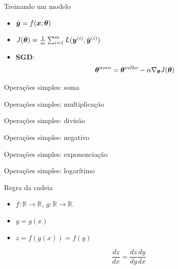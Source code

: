 \documentclass[10pt]{beamer}
\begin{document}
\begin{frame}{Treinando um modelo}
\Large{
\begin{itemize}
\item $\hat{\bm{y}} = f(\bm{x}; \bm{\theta})$ 
\item $J(\bm{\theta}) =  \frac{1}{m}\sum_{i=1}^{m} L(\bm{y}^{(i)}, {\hat{\bm{y}}}^{(i)})$ 
\item \textbf{SGD}:
\begin{equation*}
\bm{\theta}^{novo} = \bm{\theta}^{velho} - \alpha \nabla_{\bm{\theta}} {J(\bm{\theta})}
\end{equation*}
\vspace{0.3cm}
\end{itemize}
}

\end{frame}

\begin{frame}{Operações simples: soma}

\end{frame}

\begin{frame}{Operações simples: multiplicação}

\end{frame}

\begin{frame}{Operações simples: divisão}

\end{frame}

\begin{frame}{Operações simples: negativo}

\end{frame}

\begin{frame}{Operações simples: exponenciação}

\end{frame}

\begin{frame}{Operações simples: logarítimo}

\end{frame}

\begin{frame}{Regra da cadeia}
\Large{
\begin{itemize}
\item $f:\mathbb{R} \rightarrow\mathbb{R}$, $g:\mathbb{R} \rightarrow\mathbb{R}$. 
\item $y = g(x)$
\item $z = f(g(x)) = f(y)$
\end{itemize}
\[
\frac{dz}{dx} = \frac{dz}{dy} \frac{dy}{dx} 
\]
}
\end{frame}
\end{document}

